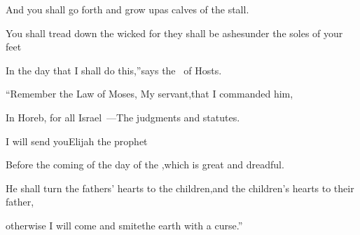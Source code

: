 \begin{inparaenum}
  \pb And you shall go forth and grow up\pa as calves of the stall.%
  
  \pa {} You shall tread down the wicked for they shall be ashes\pa under the soles of your feet%
  
  \pb In the day that I shall do this,''\pa says the \lord\ of Hosts.%
  
  \pa {}%
  ``Remember the Law of Moses, My servant,\pa that I commanded him,%
  
  \pb In Horeb, for all Israel~---\pa The judgments and statutes.%
  
  \pa {}%
  I will send you\pa Elijah the prophet%
  
  \pb Before the coming of the day of the \lord,\pa which is great and dreadful.%
  
  \pa {}%
  He shall turn the fathers' hearts to the children,\pa and the children's hearts to their father,%
  
  \pb otherwise I will come and smite\pa the earth with a curse.''%
\end{inparaenum}
